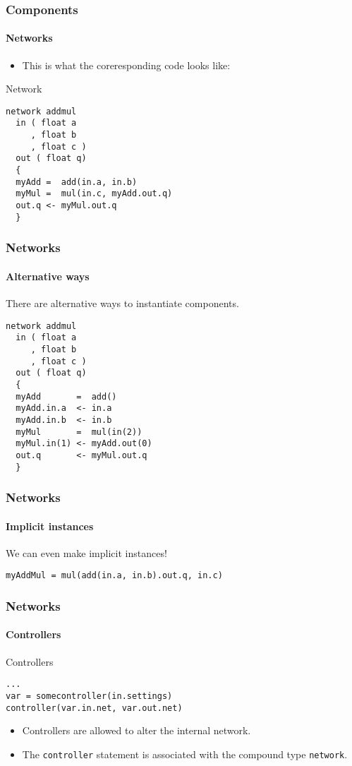 \begin{frame}[fragile]
\frametitle{Components}
\framesubtitle{Networks}

\begin{itemize}\pause
\item This is what the coreresponding code looks like:
\end{itemize}

\pause

\begin{block}{Network}
\begin{verbatim}
network addmul
  in ( float a
     , float b
     , float c )
  out ( float q)
  {
  myAdd =  add(in.a, in.b)
  myMul =  mul(in.c, myAdd.out.q)
  out.q <- myMul.out.q
  }
\end{verbatim}
\end{block}
\end{frame}


\begin{frame}[fragile]
\frametitle{Networks}
\framesubtitle{Alternative ways}

There are alternative ways to instantiate components.

\pause
\begin{example}
\begin{verbatim}
network addmul
  in ( float a
     , float b
     , float c )
  out ( float q)
  {
  myAdd       =  add()
  myAdd.in.a  <- in.a
  myAdd.in.b  <- in.b
  myMul       =  mul(in(2))
  myMul.in(1) <- myAdd.out(0)
  out.q       <- myMul.out.q
  }
\end{verbatim}
\end{example}
\end{frame}


\begin{frame}[fragile]
\frametitle{Networks}
\framesubtitle{Implicit instances}

We can even make implicit instances!

\pause
\begin{example}
\verb|myAddMul = mul(add(in.a, in.b).out.q, in.c)|
\end{example}

\end{frame}


\begin{frame}[fragile]
\frametitle{Networks}
\framesubtitle{Controllers}

\pause
\begin{block}{Controllers}
\begin{verbatim}
...
var = somecontroller(in.settings)
controller(var.in.net, var.out.net)
\end{verbatim}
\end{block}


\begin{itemize}\pause
\item Controllers are allowed to alter the internal network.\pause

\item The \verb|controller| statement is associated with the compound
  type \verb|network|.
\end{itemize}
\end{frame}



